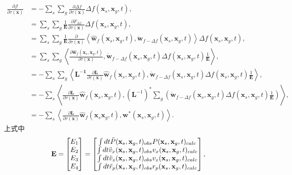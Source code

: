 \begin{equation}
	\begin{aligned}
		\frac{\partial \mathcal{J}}{\partial \tau(\mathbf{x})} &= -\sum_s \sum_g 
		\frac{\partial \Delta f}{\partial \tau(\mathbf{x})}
		\Delta f(\mathbf{x}_s,\mathbf{x}_g,t), \\
		&=\sum_s \sum_g \frac{1}{\mathbf{E}}\frac{\partial \dot{F}_{\Delta f}}
		{\partial \tau(\mathbf{x})} \Delta f(\mathbf{x}_s,\mathbf{x}_g,t), \\
		&= \sum_s \sum_g \frac{1}{\mathbf{E}}\frac{\partial}{\partial \tau(\mathbf{x})}
		\left\langle \hat{\mathbf{w}}_f(\mathbf{x}_s,\mathbf{x}_g,t), 
		\dot{\mathbf{w}}_{f-\Delta f}(\mathbf{x}_s,\mathbf{x}_g,t) \right\rangle 
		\Delta f(\mathbf{x}_s,\mathbf{x}_g,t), \\
		&= \sum_s \sum_g\left\langle \frac{\partial \hat{\mathbf{w}}_f(\mathbf{x}_s,\mathbf{x}_g,t)}
		{\partial \tau(\mathbf{x})},\dot{\mathbf{w}}_{f-\Delta f}(\mathbf{x}_s,\mathbf{x}_g,t)
		\Delta f(\mathbf{x}_s,\mathbf{x}_g,t)\frac{1}{\mathbf{E}}\right\rangle, \\
		&= -\sum_s \sum_g\left\langle \mathbf{L^{-1}}\frac{\partial \mathbf{L}}{\partial \tau(\mathbf{x})}
		\hat{\mathbf{w}}_f(\mathbf{x}_s,\mathbf{x}_g,t),\dot{\mathbf{w}}_{f-\Delta f}(
		\mathbf{x}_s,\mathbf{x}_g,t)\Delta f(\mathbf{x}_s,\mathbf{x}_g,t)\frac{1}{\mathbf{E}}\right\rangle, \\
		&=-\sum_s\left\langle\frac{\partial \mathbf{L}}{\partial \tau(\mathbf{x})}
		\hat{\mathbf{w}}_f(\mathbf{x}_s,\mathbf{x}_g,t),(\mathbf{L}^{-1})^\ast\sum_g
		\left(\dot{\mathbf{w}}_{f-\Delta f}(\mathbf{x}_s,\mathbf{x}_g,t)
		\Delta f(\mathbf{x}_s,\mathbf{x}_g,t)\frac{1}{\mathbf{E}}\right)\right\rangle, \\
		&=-\sum_s\left\langle \frac{\partial \mathbf{L}}{\partial \tau(\mathbf{x})}
		\hat{\mathbf{w}}_f(\mathbf{x}_s\mathbf{x}_g,t),
		\mathbf{w}^\ast(\mathbf{x}_s,\mathbf{x}_g,t)\right\rangle.
	\end{aligned}
	\label{eq:ad_algrithm}
\end{equation}
上式中
\begin{equation}
	\mathbf{E}=\begin{bmatrix} E_1 \cr E_2 \cr E_3 \cr E_4 \end{bmatrix}
		=\begin{bmatrix} \int dt \ddot{P}(\mathbf{x}_s,\mathbf{x}_g,t)_{obs}
		P(\mathbf{x}_s,\mathbf{x}_g,t)_{calc} \cr 
	\int dt \ddot{v}_x(\mathbf{x}_s,\mathbf{x}_g,t)_{obs}v_x(\mathbf{x}_s,\mathbf{x}_g,t)_{calc} \cr 
	\int dt \ddot{v}_z(\mathbf{x}_s,\mathbf{x}_g,t)_{obs}v_z(\mathbf{x}_s,\mathbf{x}_g,t)_{calc} \cr 
	\int dt \ddot{r}_p(\mathbf{x}_s,\mathbf{x}_g,t)_{obs}r_p(\mathbf{x}_s,\mathbf{x}_g,t)_{calc} 
		\end{bmatrix},
\end{equation}
